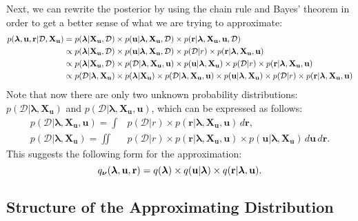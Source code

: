 \documentclass{mprop}
\theoremstyle{definition}
\begin{document}
Next, we can rewrite the posterior by using the chain rule and Bayes' theorem in
order to get a better sense of what we are trying to approximate:
\[
  \begin{split}
    p(\bm\lambda, \mathbf{u}, \mathbf{r} | \mathcal{D}, \mathbf{X_u}) &= p(\bm\lambda | \mathbf{X_u}, \mathcal{D}) \times p(\mathbf{u}
    | \bm\lambda, \mathbf{X_u}, \mathcal{D}) \times p(\mathbf{r} | \bm\lambda,
    \mathbf{X_u}, \mathbf{u}, \mathcal{D}) \\
    &\propto p(\bm\lambda | \mathbf{X_u}, \mathcal{D}) \times p(\mathbf{u} |
    \bm\lambda, \mathbf{X_u}, \mathcal{D}) \times p(\mathcal{D} | r) \times
    p(\mathbf{r} | \bm\lambda, \mathbf{X_u}, \mathbf{u}) \\
    &\propto p(\bm\lambda | \mathbf{X_u}, \mathcal{D}) \times p(\mathcal{D} |
    \bm\lambda, \mathbf{X_u}, \mathbf{u}) \times p(\mathbf{u} | \bm\lambda,
    \mathbf{X_u}) \times p(\mathcal{D} | r) \times p(\mathbf{r} | \bm\lambda,
    \mathbf{X_u}, \mathbf{u}) \\
    &\propto p(\mathcal{D} | \bm\lambda, \mathbf{X_u}) \times p(\bm\lambda |
    \mathbf{X_u}) \times p(\mathcal{D} | \bm\lambda, \mathbf{X_u}, \mathbf{u})
    \times p(\mathbf{u} | \bm\lambda, \mathbf{X_u}) \times p(\mathcal{D} | r)
    \times p(\mathbf{r} | \bm\lambda, \mathbf{X_u}, \mathbf{u})
  \end{split}
\]
Note that now there are only two unknown probability distributions:
$p(\mathcal{D} | \bm\lambda, \mathbf{X_u})$ and $p(\mathcal{D} | \bm\lambda,
\mathbf{X_u}, \mathbf{u})$, which can be expressed as follows:
\begin{align*}
  p(\mathcal{D} | \bm\lambda, \mathbf{X_u}, \mathbf{u}) = \int &p(\mathcal{D} | r) \times p(\mathbf{r} | \bm\lambda, \mathbf{X_u}, \mathbf{u}) \, d\mathbf{r}, \\
  p(\mathcal{D} | \bm\lambda, \mathbf{X_u}) = \iint &p(\mathcal{D} | r) \times p(\mathbf{r} | \bm\lambda, \mathbf{X_u}, \mathbf{u}) \times p(\mathbf{u} | \bm\lambda, \mathbf{X_u}) \, d\mathbf{u} \, d\mathbf{r}.
\end{align*}
This suggests the following form for the approximation:
\begin{equation} \label{eq:approximation}
  q_{\bm\nu}(\bm\lambda, \mathbf{u}, \mathbf{r}) = q(\bm\lambda) \times q(\mathbf{u} | \bm\lambda) \times q(\mathbf{r}
  | \bm\lambda, \mathbf{u}).
\end{equation}

\subsection{Structure of the Approximating Distribution} \label{sec:structure}
\end{document}
